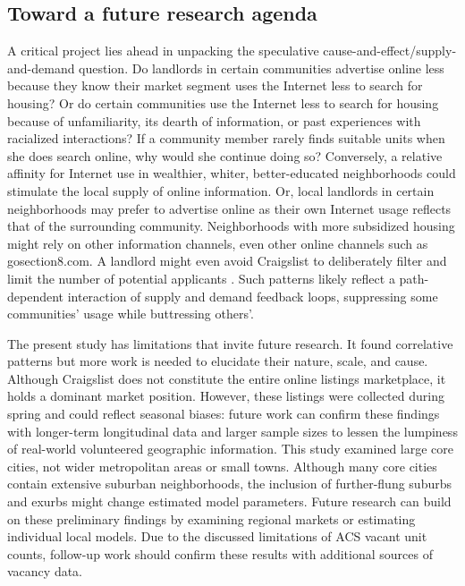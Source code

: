 \documentclass[11pt,letterpaper]{article}
\begin{document}
\subsection{Toward a future research agenda}

A critical project lies ahead in unpacking the speculative cause-and-effect/supply-and-demand question. Do landlords in certain communities advertise online less because they know their market segment uses the Internet less to search for housing? Or do certain communities use the Internet less to search for housing because of unfamiliarity, its dearth of information, or past experiences with racialized interactions? If a community member rarely finds suitable units when she does search online, why would she continue doing so? Conversely, a relative affinity for Internet use in wealthier, whiter, better-educated neighborhoods could stimulate the local supply of online information. Or, local landlords in certain neighborhoods may prefer to advertise online as their own Internet usage reflects that of the surrounding community. Neighborhoods with more subsidized housing might rely on other information channels, even other online channels such as gosection8.com. A landlord might even avoid Craigslist to deliberately filter and limit the number of potential applicants \citep{mendez_professional_2016}. Such patterns likely reflect a path-dependent interaction of supply and demand feedback loops, suppressing some communities' usage while buttressing others'.

The present study has limitations that invite future research. It found correlative patterns but more work is needed to elucidate their nature, scale, and cause. Although Craigslist does not constitute the entire online listings marketplace, it holds a dominant market position. However, these listings were collected during spring and could reflect seasonal biases: future work can confirm these findings with longer-term longitudinal data and larger sample sizes to lessen the lumpiness of real-world volunteered geographic information. This study examined large core cities, not wider metropolitan areas or small towns. Although many core cities contain extensive suburban neighborhoods, the inclusion of further-flung suburbs and exurbs might change estimated model parameters. Future research can build on these preliminary findings by examining regional markets or estimating individual local models. Due to the discussed limitations of ACS vacant unit counts, follow-up work should confirm these results with additional sources of vacancy data.
\end{document}
